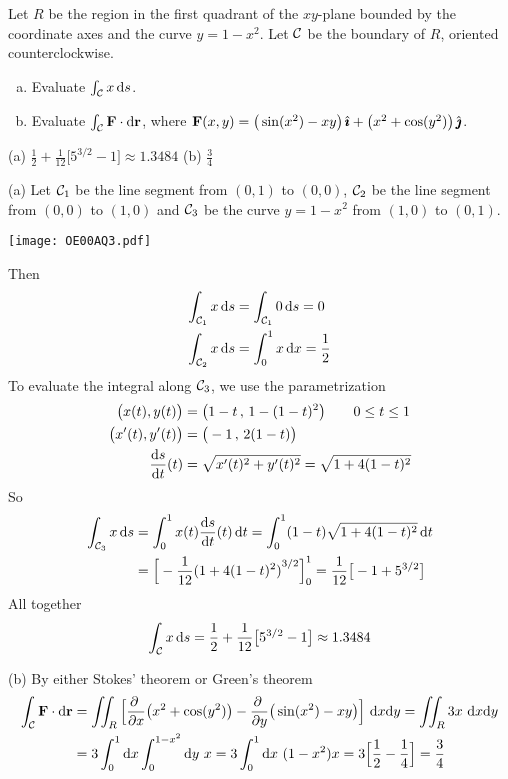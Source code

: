 \begin{question}[M317 2000A] %
Let $R$ be the region in the first quadrant of the $xy$-plane
bounded by the coordinate axes and the curve $y=1-x^2$. Let $\mathcal{C}$ be the
boundary of $R$, oriented counterclockwise.
\begin{enumerate}[(a)]
\item
Evaluate $\int_{\mathcal{C}} x\,\mathrm{d}s$.
\item
 Evaluate $\int_{\mathcal{C}} \mathbf{F}\cdot \mathrm{d}\mathbf{r}$, where $\mathbf{F}(x,y)
=\big(\sin(x^2)-xy\big)\,\hat{\pmb{\imath}}+\big(x^2+\cos(y^2)\big)\,\hat{\pmb{\jmath}}$.
\end{enumerate}
\end{question}


\begin{answer} 
(a) $\frac{1}{2}+\frac{1}{12}\big[5^{3/2}-1\big]\approx 1.3484$\qquad
(b) $\frac{3}{4}$
\end{answer}

\begin{solution} 
(a) Let $\mathcal{C}_1$ be the line segment from $(0,1)$ to $(0,0)$,
$\mathcal{C}_2$ be the line segment from $(0,0)$ to $(1,0)$ and
$\mathcal{C}_3$ be the curve $y=1-x^2$ from $(1,0)$ to $(0,1)$.

\begin{center}
   \texttt{[image: OE00AQ3.pdf]}
\end{center}


 Then
\begin{align*}
\int_{\mathcal{C}_1} x\,\mathrm{d}s&=\int_{\mathcal{C}_1} 0\,\mathrm{d}s=0\\
\int_{\mathcal{C}_2} x\,\mathrm{d}s&=\int_0^1 x\,\mathrm{d}x=\frac{1}{2}
\end{align*}
To evaluate the integral along $\mathcal{C}_3$, we use the parametrization
\begin{align*}
\big(x(t),y(t)\big) &= \big(1-t\,,\, 1-(1-t)^2\big)
\qquad 0\le t\le 1 \\
\big(x'(t),y'(t)\big) &= \big(-1\,,\, 2(1-t)\big) \\
\diff{s}{t}(t) &= \sqrt{x'(t)^2 +y'(t)^2} =\sqrt{1 + 4 (1-t)^2}
\end{align*}
So
\begin{align*}
\int_{\cC_3} x\,\dee{s}
&=\int_0^1 x(t) \diff{s}{t}(t)\,\dee{t}
=\int_0^1 (1-t)\sqrt{1+4(1-t)^2}\,\dee{t}\\
&=\Big[-\frac{1}{12}{(1+4(1-t)^2)}^{3/2}\Big]_0^1
=\frac{1}{12}\big[-1+5^{3/2}\big]
\end{align*}
All together
$$
\int_{\mathcal{C}} x\,\mathrm{d}s=\frac{1}{2}+\frac{1}{12}\big[5^{3/2}-1\big]
\approx 1.3484
$$

(b) By either Stokes' theorem or Green's theorem
\begin{align*}
\int_\cC \vF\cdot \dee{\vr}
&=\dblInt_R\Big[\pdiff{}{x}\big(x^2+\cos(y^2)\big)
-\pdiff{}{y}\big(\sin(x^2)-xy\big) \Big]\ \dee{x} \dee{y}
=\dblInt_R3x\ \dee{x} \dee{y}\\
&=3\int_0^1 \dee{x}\int_0^{1-x^2}\dee{y}\ x
=3\int_0^1 \dee{x}\ (1-x^2) x
=3\Big[\frac{1}{2}-\frac{1}{4}\Big]=\frac{3}{4}
\end{align*}
\end{solution}


